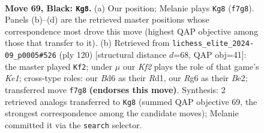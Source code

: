 \documentclass[11pt]{article}
\begin{document}
\begin{figure}[p]\centering
\begin{subfigure}{0.46\textwidth}\centering
\resizebox{\linewidth}{!}{%
\newchessgame
\chessboard[
  setfen={8/5kp1/p2b2rr/Pppb1p1p/2p2P1P/2B1P1P1/1P2K2N/1R4R1 b - - 11 69},
  showmover=false,
  pgfstyle=straightmove, color=movearrow, markmove={f7-g8}
]}
\caption{}
\end{subfigure}\hfill
\begin{subfigure}{0.46\textwidth}\centering
\resizebox{\linewidth}{!}{%
\newchessgame
\chessboard[
  setfen={2r4r/4kp2/2b1p1p1/1p1pP2p/pP3P2/P1P1R1P1/4B2P/3RK3 w - - 61 61},
  showmover=false,
  pgfstyle=straightmove, color=movearrow, markmove={e1-f2}
]}
\caption{}
\end{subfigure}
\\[4pt]

\caption{\textbf{Move 69, Black: \texttt{Kg8}.} (a) Our position; Melanie plays \texttt{Kg8} (\texttt{f7g8}). Panels (b)--(d) are the retrieved master positions whose correspondence most drove this move (highest QAP objective among those that transfer to it). (b) Retrieved from \texttt{lichess\_elite\_2024-09\_p0005\#526} (ply 120) [structural distance $d$=68, QAP obj=41]: the master played \texttt{Kf2}; under $\mu$ our \emph{Kf2} plays the role of that game's \emph{Ke1}; cross-type roles: our \emph{B}d6 as their \emph{R}d1, our \emph{R}g6 as their \emph{B}e2; transferred move \texttt{f7g8} \textbf{(endorses this move)}. Synthesis: 2 retrieved analogs transferred to \texttt{Kg8} (summed QAP objective 69, the strongest correspondence among the candidate moves); Melanie committed it via the \texttt{search} selector.}
\label{fig:thought-m137}
\end{figure}

\clearpage
\end{document}
